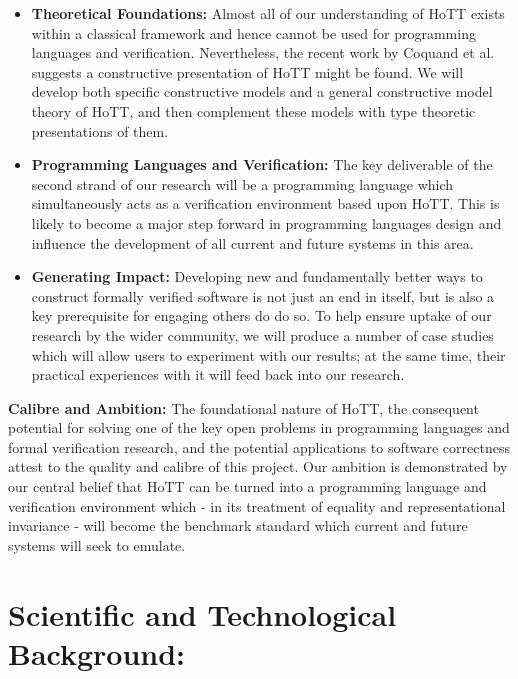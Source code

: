 \documentclass[a4paper,11pt]{article}
\begin{document}
\begin{itemize}
\item {\bf Theoretical Foundations:} Almost
  all of our understanding of HoTT exists within a classical
  framework and hence cannot be used for programming
  languages and verification. Nevertheless, the recent work by Coquand et al. suggests a
  constructive presentation of HoTT might be found. We will develop
  both specific constructive models and a general constructive model
  theory of HoTT, and then complement these models with type theoretic
  presentations of them. 
\item {\bf Programming Languages and Verification:} The key
  deliverable of the second strand of our research will be a
  programming language which simultaneously acts as a verification
  environment based upon HoTT. This is likely to become a major
  step forward in programming languages design and influence
  the development of all current and future systems in this area.
\item {\bf Generating Impact:} Developing new and fundamentally
  better ways to construct formally verified software is not just an
  end in itself, but is also a key prerequisite for engaging others do
  do so.  To help ensure uptake of our research by the wider
  community, we will produce a number of case studies which will allow
  users to experiment with our results; at the same time, their
  practical experiences with it will feed back into our research.
\end{itemize}

{\bf Calibre and Ambition:} The foundational nature of HoTT, the
consequent potential for solving one of the key open problems in
programming languages and formal verification research, and the
potential applications to software correctness attest to the quality
and calibre of this project. Our ambition is demonstrated by our
central belief that HoTT can be turned into a programming language and
verification environment which - in its treatment of equality and
representational invariance - will become the benchmark standard which
current and future systems will seek to emulate.

\section{Scientific and Technological Background:}
\end{document}
